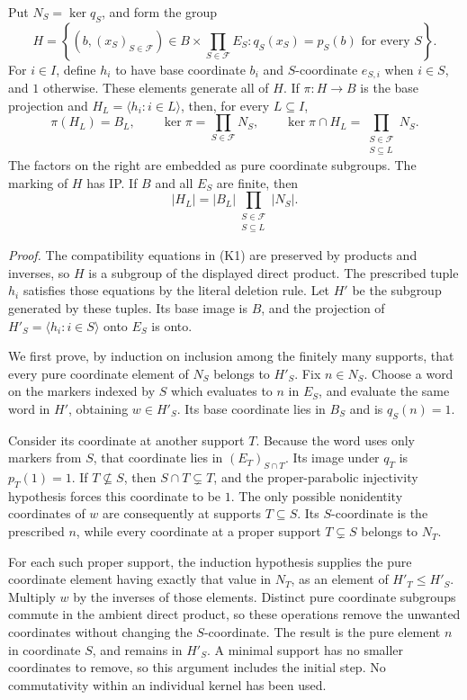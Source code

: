\documentclass[
  11pt,
  a4paper,
]{article}
\begin{document}
Put \(N_S=\ker q_S\), and form the group \[
H=\left\{(b,(x_S)_{S\in\mathcal F})\in
B\times\prod_{S\in\mathcal F}E_S:
q_S(x_S)=p_S(b)\text{ for every }S\right\}.
\tag{K1}
\] For \(i\in I\), define \(h_i\) to have base coordinate \(b_i\) and
\(S\)-coordinate \(e_{S,i}\) when \(i\in S\), and \(1\) otherwise. These
elements generate all of \(H\). If \(\pi:H\to B\) is the base projection
and \(H_L=\langle h_i:i\in L\rangle\), then, for every \(L\subseteq I\),
\[
\pi(H_L)=B_L,\qquad
\ker\pi=\prod_{S\in\mathcal F}N_S,\qquad
\ker\pi\cap H_L=\prod_{\substack{S\in\mathcal F\\S\subseteq L}}N_S.
\tag{K2}
\] The factors on the right are embedded as pure coordinate subgroups.
The marking of \(H\) has IP. If \(B\) and all \(E_S\) are finite, then
\[
|H_L|=|B_L|\prod_{\substack{S\in\mathcal F\\S\subseteq L}}|N_S|.
\tag{K3}
\]

\emph{Proof.} The compatibility equations in (K1) are preserved by
products and inverses, so \(H\) is a subgroup of the displayed direct
product. The prescribed tuple \(h_i\) satisfies those equations by the
literal deletion rule. Let \(H'\) be the subgroup generated by these
tuples. Its base image is \(B\), and the projection of
\(H'_S=\langle h_i:i\in S\rangle\) onto \(E_S\) is onto.

We first prove, by induction on inclusion among the finitely many
supports, that every pure coordinate element of \(N_S\) belongs to
\(H'_S\). Fix \(n\in N_S\). Choose a word on the markers indexed by
\(S\) which evaluates to \(n\) in \(E_S\), and evaluate the same word in
\(H'\), obtaining \(w\in H'_S\). Its base coordinate lies in \(B_S\) and
is \(q_S(n)=1\).

Consider its coordinate at another support \(T\). Because the word uses
only markers from \(S\), that coordinate lies in \((E_T)_{S\cap T}\).
Its image under \(q_T\) is \(p_T(1)=1\). If \(T\not\subseteq S\), then
\(S\cap T\subsetneq T\), and the proper-parabolic injectivity hypothesis
forces this coordinate to be \(1\). The only possible nonidentity
coordinates of \(w\) are consequently at supports \(T\subseteq S\). Its
\(S\)-coordinate is the prescribed \(n\), while every coordinate at a
proper support \(T\subsetneq S\) belongs to \(N_T\).

For each such proper support, the induction hypothesis supplies the pure
coordinate element having exactly that value in \(N_T\), as an element
of \(H'_T\leq H'_S\). Multiply \(w\) by the inverses of those elements.
Distinct pure coordinate subgroups commute in the ambient direct
product, so these operations remove the unwanted coordinates without
changing the \(S\)-coordinate. The result is the pure element \(n\) in
coordinate \(S\), and remains in \(H'_S\). A minimal support has no
smaller coordinates to remove, so this argument includes the initial
step. No commutativity within an individual kernel has been used.
\end{document}

